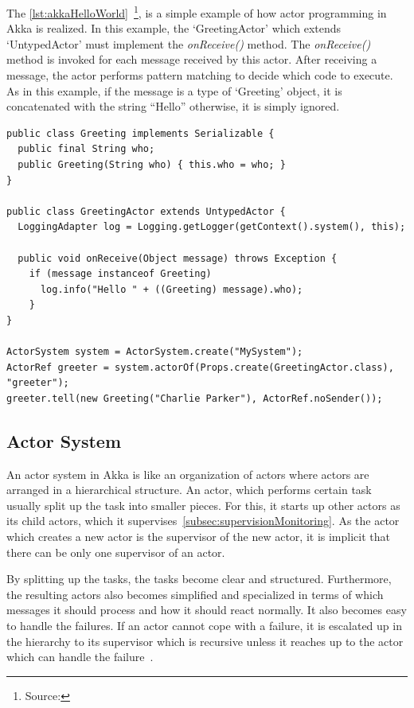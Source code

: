   The \autoref{lst:akkaHelloWorld}~\footnote{Source: }, is a simple example of how actor programming in Akka is realized. In this example, the ‘GreetingActor’ which extends ‘UntypedActor’ must implement the \emph{onReceive()} method. The \emph{onReceive()} method is invoked for each message received by this actor. After receiving a message, the actor performs pattern matching to decide which code to execute. As in this example, if the message is a type of ‘Greeting’ object, it is concatenated with the string “Hello” otherwise, it is simply ignored.

\begin{lstlisting}[caption=A simple example of actor programming in akka~\cite{akkaHome}, label=lst:akkaHelloWorld]
public class Greeting implements Serializable {
  public final String who;
  public Greeting(String who) { this.who = who; }
}

public class GreetingActor extends UntypedActor {
  LoggingAdapter log = Logging.getLogger(getContext().system(), this);

  public void onReceive(Object message) throws Exception {
    if (message instanceof Greeting)
      log.info("Hello " + ((Greeting) message).who);
    }
}

ActorSystem system = ActorSystem.create("MySystem");
ActorRef greeter = system.actorOf(Props.create(GreetingActor.class), "greeter");
greeter.tell(new Greeting("Charlie Parker"), ActorRef.noSender());
\end{lstlisting}


  \subsection{Actor System}
  \label{subsec:actorSystem}
      An actor system in Akka is like an organization of actors where actors are arranged in a hierarchical structure. An actor, which performs certain task usually split up the task into smaller pieces. For this, it starts up other actors as its child actors, which it supervises~\autoref{subsec:supervisionMonitoring}. As the actor which creates a new actor is the supervisor of the new actor, it is implicit that there can be only one supervisor of an actor.

  By splitting up the tasks, the tasks become clear and structured. Furthermore, the resulting actors also becomes simplified and specialized in terms of which messages it should process and how it should react normally. It also becomes easy to handle the failures. If an actor cannot cope with a failure, it is escalated up in the hierarchy to its supervisor which is recursive unless it reaches up to the actor which can handle the failure~\cite{akkaJavaDoc}.

